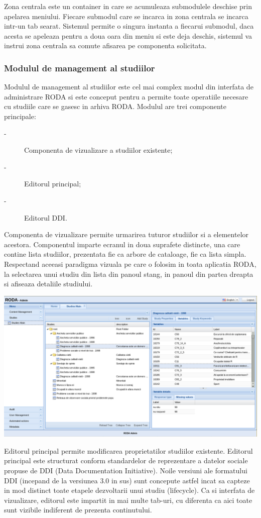 \documentclass[a4paper, 10pt]{article}
\begin{document}
{Zona centrala este un container in care se acumuleaza submodulele
deschise prin apelarea meniului. Fiecare submodul care se incarca
in zona centrala se incarca intr-un tab searat. Sistemul permite o
singura instanta a fiecarui submodul, daca acesta se apeleaza pentru
a doua oara din meniu si este deja deschis, sistemul va instrui zona
centrala sa comute afisarea pe componenta solicitata. 

\subsubsection{Modulul de management al studiilor}

Modulul de management al studiilor este cel mai complex modul din
interfata de administrare RODA si este conceput pentru a permite toate
operatiile necesare cu studiile care se gasesc in arhiva RODA. Modulul
are trei componente principale:
\begin{description}
\item [{-}] Componenta de vizualizare a studiilor existente;
\item [{-}] Editorul principal;
\item [{-}] Editorul DDI.
\end{description}
Componenta de vizualizare permite urmarirea tuturor studiilor si
a elementelor acestora. Componentul imparte ecranul in doua suprafete
distincte, una care contine lista studiilor, prezentata fie ca arbore
de cataloage, fie ca lista simpla. Respectand aceeasi paradigma vizuala
pe care o folosim in toata aplicatia RODA, la selectarea unui studiu
din lista din panoul stang, in panoul din partea dreapta si afiseaza
detaliile studiului. 

\medskip
\includegraphics[width=\textwidth]{img/study-tree-compl}
\medskip

Editorul principal permite modificarea proprietatilor studiilor existente.
Editorul principal este structurat conform standardelor de reprezentare
a datelor sociale propuse de DDI (Data Documentation Initiative).
Noile versiuni ale formatului DDI (incepand de la versiunea 3.0 in
sus) sunt concepute astfel incat sa capteze in mod distinct toate
etapele dezvoltarii unui studiu (lifecycle). Ca si interfata de vizualizare,
editorul este impartit in mai multe tab-uri, cu diferenta ca aici
toate sunt vizibile indiferent de prezenta continutului.

}
\end{document}
